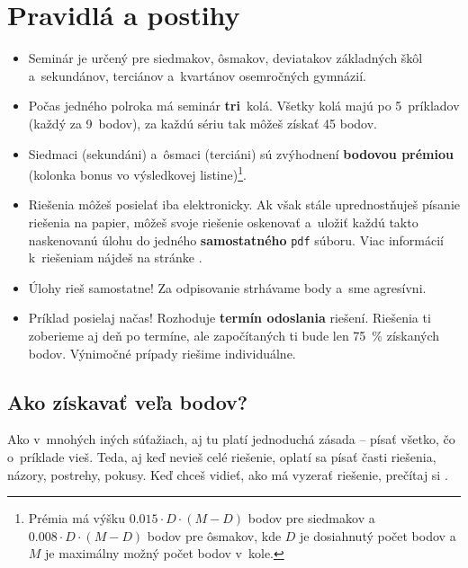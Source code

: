 \pagestyle{rules}

\section{Pravidlá a postihy}
\begin{itemize}
    \item Seminár je určený pre siedmakov, ôsmakov, deviatakov základných škôl a~sekundánov, terciánov a~kvartánov osemročných gymnázií. 

    \item Počas jedného polroka má seminár \textbf{tri}~kolá. Všetky kolá majú po 5~príkladov (každý za 9~bodov), za každú sériu tak môžeš získať 45 bodov.

    \item Siedmaci (sekundáni) a~ôsmaci (terciáni) sú zvýhodnení \textbf{bodovou prémiou} (kolonka bonus vo výsledkovej
        listine)\footnote{Prémia má výšku $\num{0.015} \cdot D \cdot (M - D)$ bodov pre siedmakov a $\num{0.008} \cdot D \cdot (M - D)$ bodov pre ôsmakov,
        kde $D$ je dosiahnutý počet bodov a $M$ je maximálny možný počet bodov v~kole.}.

    \item Riešenia môžeš posielať iba elektronicky. Ak však stále uprednostňuješ písanie riešenia na papier,
        môžeš svoje riešenie oskenovať a~uložiť každú takto naskenovanú úlohu do jedného \textbf{samostatného} \texttt{pdf} súboru.
        Viac informácií k~riešeniam nájdeš na stránke .

    \item Úlohy rieš samostatne! Za odpisovanie strhávame body a~sme agresívni. 

    \item Príklad posielaj načas! Rozhoduje \textbf{termín odoslania} riešení. Riešenia ti zoberieme
        aj deň po termíne, ale započítaných ti bude len \SI{75}{\percent} získaných bodov. Výnimočné prípady riešime individuálne.
\end{itemize}

\subsection{Ako získavať veľa bodov?}
    Ako v~mnohých iných súťažiach, aj tu platí jednoduchá zásada -- písať všetko, čo o~príklade vieš. Teda, aj keď nevieš celé riešenie, oplatí sa písať časti
    riešenia, názory, postrehy, pokusy. Keď chceš vidieť, ako má vyzerať riešenie, prečítaj si . 

